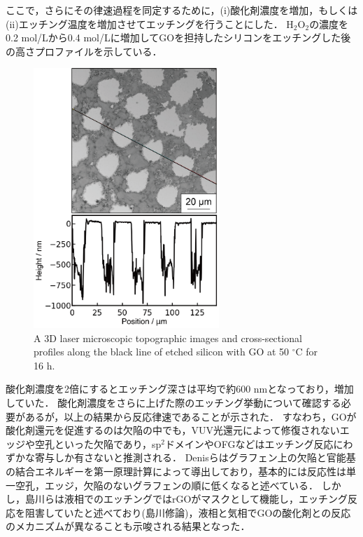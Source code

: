 \documentclass[platex,dvipdfmx]{jlreq}			%
\begin{document}
ここで，さらにその律速過程を同定するために，(i)酸化剤濃度を増加，もしくは(ii)エッチング温度を増加させてエッチングを行うことにした．
H$_2$O$_2$の濃度を0.2 mol/Lから0.4 mol/Lに増加してGOを担持したシリコンをエッチングした後の高さプロファイルを示している．

\begin{figure}[H]
    \centering
    \includegraphics[width=70mm]{figures/figure11.png}
    \caption{A 3D laser microscopic topographic images and cross-sectional profiles along the black line of etched silicon with GO at 50  ${}^\circ$C for 16 h.}
    \label{fig:Laser_h2o2}
\end{figure}

酸化剤濃度を2倍にするとエッチング深さは平均で約600 nmとなっており，増加していた．
酸化剤濃度をさらに上げた際のエッチング挙動について確認する必要があるが，以上の結果から反応律速であることが示された．
すなわち，GOが酸化剤還元を促進するのは欠陥の中でも，VUV光還元によって修復されないエッジや空孔といった欠陥であり，sp$^2$ドメインやOFGなどはエッチング反応にわずかな寄与しか有さないと推測される．
Denisらはグラフェン上の欠陥と官能基の結合エネルギーを第一原理計算によって導出しており，基本的には反応性は単一空孔，エッジ，欠陥のないグラフェンの順に低くなると述べている\supercite{denis_comparative_2013}．
しかし，島川らは液相でのエッチングではrGOがマスクとして機能し，エッチング反応を阻害していたと述べており(島川修論)，液相と気相でGOの酸化剤との反応のメカニズムが異なることも示唆される結果となった．
\end{document}
